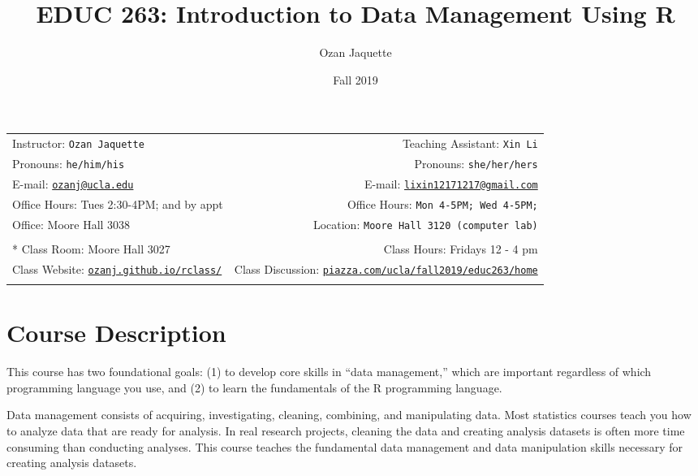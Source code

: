\documentclass[11pt,]{article}
\title{EDUC 263: Introduction to Data Management Using R}
\author{Ozan Jaquette}
\date{Fall 2019}
\begin{document}
  

		\maketitle
		
	
		\thispagestyle{firststyle}



	\noindent \begin{tabular*}{\textwidth}{ @{\extracolsep{\fill}} lr @{\extracolsep{\fill}}}


Instructor: \texttt{Ozan Jaquette} & Teaching Assistant: \texttt{Xin Li} \\
Pronouns: \texttt{he/him/his} & Pronouns: \texttt{she/her/hers} \\
E-mail: \texttt{\href{mailto:ozanj@ucla.edu}{\nolinkurl{ozanj@ucla.edu}}} & E-mail: \texttt{\href{mailto:lixin12171217@gmail.com}{\nolinkurl{lixin12171217@gmail.com}}} \\ 
Office Hours: Tues 2:30-4PM; and by appt  & Office Hours: \texttt{Mon 4-5PM; Wed 4-5PM;} \\
Office: Moore Hall 3038 & Location: \texttt{Moore Hall 3120 (computer lab)} \\
\\ *
Class Room: Moore Hall 3027 & Class Hours: Fridays 12 - 4 pm\\
Class Website: \href{http://ozanj.github.io/rclass/}{\tt ozanj.github.io/rclass/} & Class Discussion: \href{http://piazza.com/ucla/fall2019/educ263/home}{\tt piazza.com/ucla/fall2019/educ263/home}\\
	&  \\
	\hline
	\end{tabular*}
	
\vspace{2mm}
	


\section{Course Description}\label{course-description}

This course has two foundational goals: (1) to develop core skills in
``data management,'' which are important regardless of which programming
language you use, and (2) to learn the fundamentals of the R programming
language.

Data management consists of acquiring, investigating, cleaning,
combining, and manipulating data. Most statistics courses teach you how
to analyze data that are ready for analysis. In real research projects,
cleaning the data and creating analysis datasets is often more time
consuming than conducting analyses. This course teaches the fundamental
data management and data manipulation skills necessary for creating
analysis datasets.
\end{document}
